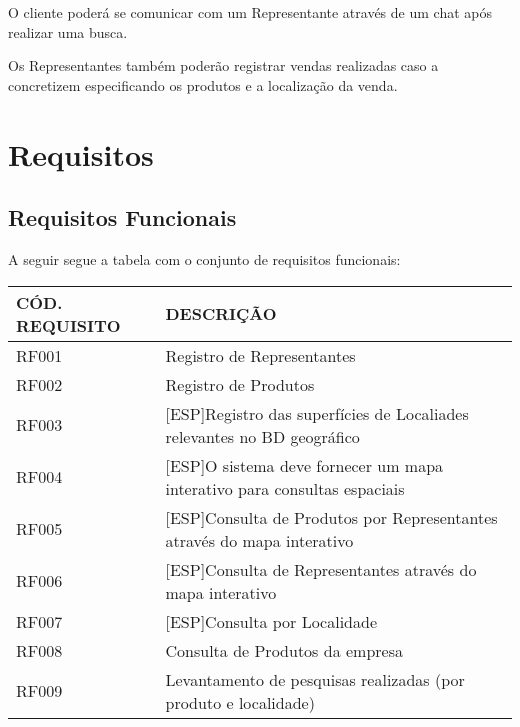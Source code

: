 \documentclass[oneside]{article}
\begin{document}
O cliente poderá se comunicar com um Representante através de um chat após realizar
uma busca.

Os Representantes também poderão registrar vendas realizadas caso a concretizem
especificando os produtos e a localização da venda.
\clearpage
\section{Requisitos}
\subsection{Requisitos Funcionais}
A seguir segue a tabela com o conjunto de requisitos funcionais:
\begin{center}
    \begin{tabular}{| l | p{8cm} |}
        \hline
        CÓD. REQUISITO & DESCRIÇÃO \\ \hline
        RF001 & Registro de Representantes \\ \hline
        RF002 & Registro de Produtos \\ \hline
        RF003 & [ESP]Registro das superfícies de Localiades relevantes no BD geográfico \\ \hline
        RF004 & [ESP]O sistema deve fornecer um mapa interativo para consultas espaciais \\ \hline
        RF005 & [ESP]Consulta de Produtos por Representantes através do mapa interativo \\ \hline
        RF006 & [ESP]Consulta de Representantes através do mapa interativo  \\ \hline
        RF007 & [ESP]Consulta por Localidade \\ \hline
        RF008 & Consulta de Produtos da empresa \\ \hline
        RF009 & Levantamento de pesquisas realizadas (por produto e localidade)\\
        \hline
    \end{tabular}
\end{center}
\end{document}
